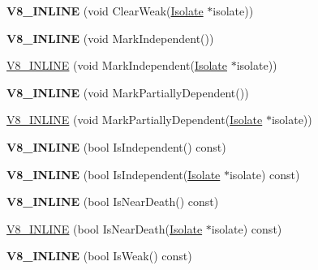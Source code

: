 \begin{DoxyCompactItemize}
\item 
\hypertarget{classv8_1_1_persistent_a500449e9aaa394cd9df95c698a487ac9}{}{\bfseries V8\+\_\+\+I\+N\+L\+I\+N\+E} (void Clear\+Weak(\hyperlink{classv8_1_1_isolate}{Isolate} $\ast$isolate))\label{classv8_1_1_persistent_a500449e9aaa394cd9df95c698a487ac9}

\item 
\hypertarget{classv8_1_1_persistent_aa8497281225e9678f03b6997ae559960}{}{\bfseries V8\+\_\+\+I\+N\+L\+I\+N\+E} (void Mark\+Independent())\label{classv8_1_1_persistent_aa8497281225e9678f03b6997ae559960}

\item 
\hyperlink{classv8_1_1_persistent_a2b4071c032c97886ba1bcb0ebacb2209}{V8\+\_\+\+I\+N\+L\+I\+N\+E} (void Mark\+Independent(\hyperlink{classv8_1_1_isolate}{Isolate} $\ast$isolate))
\item 
\hypertarget{classv8_1_1_persistent_ab096f22fc5023ba07631537633b42565}{}{\bfseries V8\+\_\+\+I\+N\+L\+I\+N\+E} (void Mark\+Partially\+Dependent())\label{classv8_1_1_persistent_ab096f22fc5023ba07631537633b42565}

\item 
\hyperlink{classv8_1_1_persistent_a89a708d5a98331a2683324be9dc5a474}{V8\+\_\+\+I\+N\+L\+I\+N\+E} (void Mark\+Partially\+Dependent(\hyperlink{classv8_1_1_isolate}{Isolate} $\ast$isolate))
\item 
\hypertarget{classv8_1_1_persistent_ae63945077238e19dbe1566c316c1c774}{}{\bfseries V8\+\_\+\+I\+N\+L\+I\+N\+E} (bool Is\+Independent() const)\label{classv8_1_1_persistent_ae63945077238e19dbe1566c316c1c774}

\item 
\hypertarget{classv8_1_1_persistent_a0cb1529e8138c0072f6efac79056e225}{}{\bfseries V8\+\_\+\+I\+N\+L\+I\+N\+E} (bool Is\+Independent(\hyperlink{classv8_1_1_isolate}{Isolate} $\ast$isolate) const)\label{classv8_1_1_persistent_a0cb1529e8138c0072f6efac79056e225}

\item 
\hypertarget{classv8_1_1_persistent_a480643005f3ce865ea6084a9249dbf6f}{}{\bfseries V8\+\_\+\+I\+N\+L\+I\+N\+E} (bool Is\+Near\+Death() const)\label{classv8_1_1_persistent_a480643005f3ce865ea6084a9249dbf6f}

\item 
\hyperlink{classv8_1_1_persistent_af76521b3119940e7200fd12ea6aac533}{V8\+\_\+\+I\+N\+L\+I\+N\+E} (bool Is\+Near\+Death(\hyperlink{classv8_1_1_isolate}{Isolate} $\ast$isolate) const)
\item 
\hypertarget{classv8_1_1_persistent_ab3ecacdf4c67a295d57658e348153b6c}{}{\bfseries V8\+\_\+\+I\+N\+L\+I\+N\+E} (bool Is\+Weak() const)\label{classv8_1_1_persistent_ab3ecacdf4c67a295d57658e348153b6c}


\end{DoxyCompactItemize}
